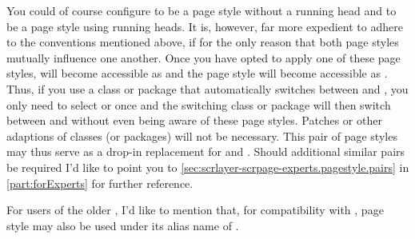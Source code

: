 You could of course configure  to be a page style
without a running head and  to be a page style
using running heads. It is, however, far more expedient to adhere to the
conventions mentioned above, if for the only reason that both page styles
mutually influence one another.  Once you have opted to apply one of these
page styles,  will become accessible as
 and the page style  will
become accessible as . Thus, if you use a class or package
that automatically switches between  and
, you only need to select  or
 once and the switching class or package will
then switch between  and 
without even being aware of these page styles. Patches or other adaptions of
classes (or packages) will not be necessary. This pair of page styles may thus
serve as a drop-in replacement for  and .
Should additional similar pairs be required I'd like to point you to
\autoref{sec:scrlayer-scrpage-experts.pagestyle.pairs} in
\autoref{part:forExperts} for further reference.

For users of the older , I'd like to mention that, for
compatibility with , page style
 may also be used under its alias name of
.%
%
%
%

